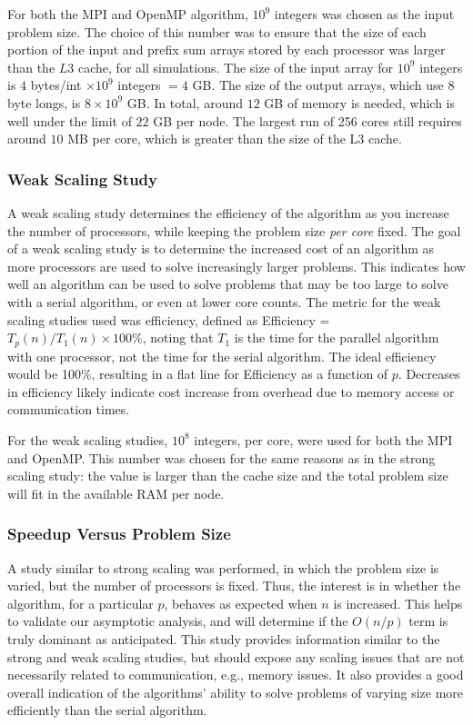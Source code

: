 \documentclass[12pt]{article}
\begin{document}
\begin{algorithm}
{{{For both the MPI and OpenMP algorithm, $10^9$ integers was chosen as the input
problem size. The choice of this number was to ensure that the size of each portion of
the input and prefix sum arrays stored by each processor was larger than the $L3$
cache, for all simulations.  The size of the input array for $10^9$ integers is $4$ bytes/int
$\times 10^9$ integers $=4$ GB.  The size of the output arrays, which use 8 byte
longs, is $8\times 10^9$ GB. In total, around $12$ GB of memory is needed, which is well
under the limit of $22$ GB per node.  The largest run of 256 cores still requires
around $10$ MB per core, which is greater than the size of the L3 cache.


\subsubsection{Weak Scaling Study}

A weak scaling study determines the efficiency of the algorithm as you increase the
number of processors, while keeping the problem size \emph{per core} fixed.
The goal of a weak scaling study is to determine the increased cost of an algorithm
as more processors are used to solve increasingly larger problems. This indicates how
well an algorithm can be used to solve problems that may be too large to solve with a
serial algorithm, or even at lower core counts.  The metric for the weak scaling studies used was efficiency,
defined as Efficiency = $T_p(n)/T_1(n)\times 100\%$, noting that $T_1$ is the time for the parallel
algorithm with one processor, not the time for the serial algorithm.  The ideal
efficiency would be 100\%, resulting in a flat line for Efficiency as a function of
$p$.  Decreases in efficiency likely indicate cost increase from overhead due to memory access or
communication times.

For the weak scaling studies, $10^8$ integers, per core, were used for both the MPI
and OpenMP.  This number was chosen for the same reasons as in the strong scaling
study: the value is larger than the cache size and the total problem size will fit in
the available RAM per node.

\subsubsection{Speedup Versus Problem Size}

A study similar to strong scaling was performed, in which the problem size is varied,
but the number of processors is fixed.  Thus, the interest is in whether the
algorithm, for a particular $p$, behaves as expected when $n$ is increased.  This
helps to validate our asymptotic analysis, and will determine if the $O(n/p)$ term is
truly dominant as anticipated.  This study provides information similar to the strong and weak scaling studies, but
should expose any scaling issues that are not necessarily related to communication,
e.g., memory issues.
It also provides a good overall indication of the algorithms' ability to solve
problems of varying size more efficiently than the serial algorithm.

}}}
\end{algorithm}
\end{document}

